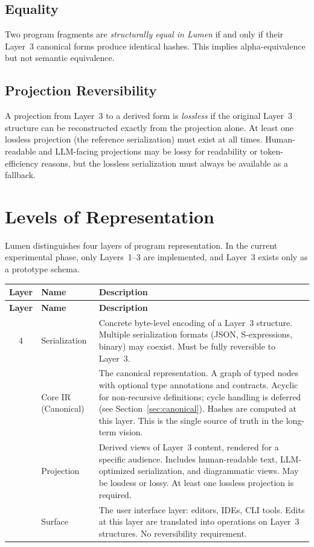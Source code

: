\documentclass[11pt]{article}
\begin{document}
\subsection*{Equality}

Two program fragments are \emph{structurally equal in Lumen} if and
only if their Layer~3 canonical forms produce identical hashes.  This
implies alpha-equivalence but not semantic equivalence.

\subsection*{Projection Reversibility}

A projection from Layer~3 to a derived form is \emph{lossless} if the
original Layer~3 structure can be reconstructed exactly from the
projection alone.  At least one lossless projection (the reference
serialization) must exist at all times.  Human-readable and LLM-facing
projections may be lossy for readability or token-efficiency reasons,
but the lossless serialization must always be available as a fallback.


\section{Levels of Representation}
\label{sec:levels}

Lumen distinguishes four layers of program representation.  In the
current experimental phase, only Layers~1--3 are implemented, and
Layer~3 exists only as a prototype schema.

\begin{longtable}{@{}clp{7.5cm}@{}}
  \toprule
  \textbf{Layer} & \textbf{Name} & \textbf{Description} \\
  \midrule
  \endfirsthead
  \toprule
  \textbf{Layer} & \textbf{Name} & \textbf{Description} \\
  \midrule
  \endhead
  4 & Serialization &
      Concrete byte-level encoding of a Layer~3 structure.
      Multiple serialization formats (JSON, S-expressions, binary)
      may coexist.  Must be fully reversible to Layer~3. \\
  \addlinespace
  3 & Core IR (Canonical) &
      The canonical representation.  A graph of typed nodes with
      optional type annotations and contracts.  Acyclic for
      non-recursive definitions; cycle handling is deferred (see
      Section~\ref{sec:canonical}).  Hashes are computed at this
      layer.  This is the single source of truth in the long-term
      vision. \\
  \addlinespace
  2 & Projection &
      Derived views of Layer~3 content, rendered for a specific
      audience.  Includes human-readable text, LLM-optimized
      serialization, and diagrammatic views.  May be lossless or
      lossy.  At least one lossless projection is required. \\
  \addlinespace
  1 & Surface &
      The user interface layer: editors, IDEs, CLI tools.
      Edits at this layer are translated into operations on
      Layer~3 structures.  No reversibility requirement. \\
  \bottomrule
\end{longtable}
\end{document}
